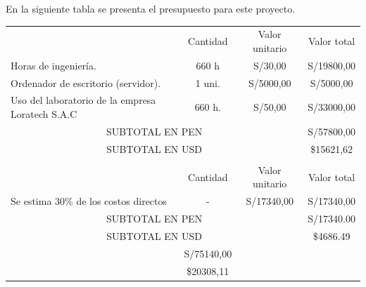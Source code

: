 \documentclass[
11pt, %
]{charter}
\begin{document}
En la siguiente tabla se presenta el presupuesto para este proyecto. 
\begin{table}[htpb]
\centering
\begin{tabularx}{\linewidth}{@{}|X|c|r|r|@{}}
\hline
\rowcolor[HTML]{C0C0C0} 
\multicolumn{4}{|c|}{\cellcolor[HTML]{C0C0C0}COSTOS DIRECTOS} \\ \hline
\rowcolor[HTML]{C0C0C0} 
\multicolumn{1}{c|}{\cellcolor[HTML]{C0C0C0}Descripción}&
\multicolumn{1}{c|}{\cellcolor[HTML]{C0C0C0}Cantidad} &
\multicolumn{1}{c|}{\cellcolor[HTML]{C0C0C0}Valor unitario} &
\multicolumn{1}{c|}{\cellcolor[HTML]{C0C0C0}Valor total} \\ \hline
Horas de ingeniería.&
\multicolumn{1}{c|}{660 h} &
\multicolumn{1}{c|}{S/30,00} &
\multicolumn{1}{c|}{S/19800,00} \\ \hline
\multicolumn{1}{|l|}{Ordenador de escritorio (servidor).} &
\multicolumn{1}{c|}{1 uni.} &
\multicolumn{1}{c|}{S/5000,00} &
\multicolumn{1}{c|}{S/5000,00} \\ \hline
\multicolumn{1}{|l|}{Uso del laboratorio de la empresa Loratech S.A.C} &
\multicolumn{1}{c|}{660 h.} &
\multicolumn{1}{c|}{S/50,00} &
\multicolumn{1}{c|}{S/33000,00} \\ \hline
\multicolumn{3}{|c|}{SUBTOTAL EN PEN} &
  	\multicolumn{1}{c|}{S/57800,00} \\ \hline
\multicolumn{3}{|c|}{SUBTOTAL EN USD} &
  	\multicolumn{1}{c|}{\$15621,62} \\ \hline  	
\rowcolor[HTML]{C0C0C0} 
\multicolumn{4}{|c|}{\cellcolor[HTML]{C0C0C0}COSTOS INDIRECTOS} \\ \hline
\rowcolor[HTML]{C0C0C0} 
\multicolumn{1}{c|}{\cellcolor[HTML]{C0C0C0}Descripción}&
\multicolumn{1}{c|}{\cellcolor[HTML]{C0C0C0}Cantidad} &
\multicolumn{1}{c|}{\cellcolor[HTML]{C0C0C0}Valor unitario} &
\multicolumn{1}{c|}{\cellcolor[HTML]{C0C0C0}Valor total} \\ \hline
\multicolumn{1}{|l|}{Se estima 30\% de los costos directos} &
\multicolumn{1}{c|}{-} &
\multicolumn{1}{c|}{S/17340,00} &
\multicolumn{1}{c|}{S/17340,00} \\ \hline
\multicolumn{3}{|c|}{SUBTOTAL EN PEN} &
  \multicolumn{1}{c|}{S/17340.00} \\ \hline
\multicolumn{3}{|c|}{SUBTOTAL EN USD} &
  \multicolumn{1}{c|}{\$4686.49} \\ \hline  
\rowcolor[HTML]{C0C0C0}
\multicolumn{3}{|c|}{TOTAL EN PEN} & 
  \multicolumn{1}{c|}{S/75140,00}\\ \hline
\rowcolor[HTML]{C0C0C0}
\multicolumn{3}{|c|}{TOTAL EN USD} &  
  \multicolumn{1}{c|}{\$20308,11}\\ \hline
\end{tabularx}%
\end{table} \newline
\end{document}

